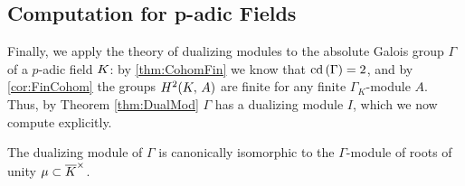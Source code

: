 \documentclass[a4paper, oneside]{memoir}
\begin{document}
\subsection{Computation for p-adic Fields}

Finally, we apply the theory of dualizing modules to the absolute Galois group \(\Gamma\) of a \(p\)-adic field \(K\): by \ref{thm:CohomFin} we know that \(\operatorname{cd}{(\Gamma)}=2\), and by \ref{cor:FinCohom} the groups \(H^{2}( K, \, A )\) are finite for any finite \(\Gamma_K\)-module $A$. Thus, by Theorem \ref{thm:DualMod} \(\Gamma\) has a dualizing module \(I\), which we now compute explicitly.

\begin{proposition}
	The dualizing module of \(\Gamma\) is canonically isomorphic to the \(\Gamma\)-module of roots of unity \(\mu\subset\overline{K}^\times\).
\end{proposition}
\end{document}
